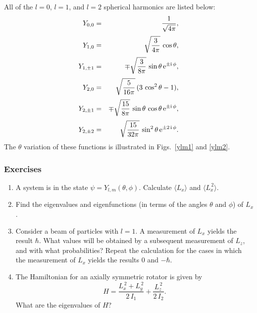 All of the $l=0$, $l=1$, and $l=2$ spherical harmonics are listed below:
\begin{eqnarray}
Y_{0,0} &=&\frac{1}{\sqrt{4\pi}},\\[0.5ex]
Y_{1,0} &=& \sqrt{\frac{3}{4\pi}}\,\cos\theta,\\[0.5ex]
Y_{1,\pm1} &=& \mp \sqrt{\frac{3}{8\pi}}\,\sin\theta\,{\rm e}^{\pm{\rm i}\,\phi},\\[0.5ex]
Y_{2,0} &=& \sqrt{\frac{5}{16\pi}}\,(3\,\cos^2\theta - 1),\\[0.5ex]
Y_{2,\pm 1}&=&\mp\sqrt{\frac{15}{8\pi}}\,\sin\theta\,\cos\theta\,{\rm e}^{\pm{\rm i}\,\phi},\\[0.5ex]
Y_{2,\pm 2}&=& \sqrt{\frac{15}{32\pi}}\,\sin^2\theta\,{\rm e}^{\pm 2\,{\rm i}\,\phi}.
\end{eqnarray}
The $\theta$ variation of these functions is illustrated in Figs.~\ref{ylm1} and
\ref{ylm2}.


\subsubsection*{Exercises}
{\small
\begin{enumerate}
\item A system is in the state $\psi=Y_{l,m}(\theta,\phi)$. Calculate
$\langle L_x\rangle$ and $\langle L_x^{\,2}\rangle$. 

\item Find the eigenvalues and eigenfunctions (in terms of the
angles $\theta$ and $\phi$) of $L_x$. 

\item Consider a beam of particles with $l=1$. A measurement
of $L_x$ yields the result $\hbar$. What values will be
obtained by a subsequent measurement of $L_z$, and with what probabilities? Repeat the calculation for the cases in which the
measurement of $L_x$ yields the results $0$ and $-\hbar$. 

\item The Hamiltonian for an axially symmetric rotator is given by
$$
H = \frac{L_x^{\,2}+L_y^{\,2}}{2\,I_1} + \frac{L_z^{\,2}}{2\,I_2}.
$$
What are the eigenvalues of $H$?
\end{enumerate}
}